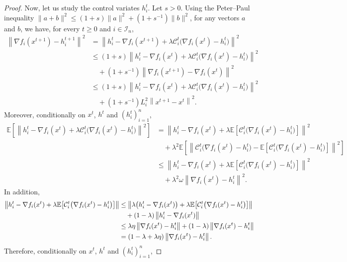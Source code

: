 \documentclass{article} %
\theoremstyle{plain}
\theoremstyle{definition}
\theoremstyle{remark}
\newcommand{\sqnorm}[1]{\left\| #1 \right\|^2}
\newcommand{\Exp}[1]{\mathbb{E}\!\left[ #1 \right]}
\begin{document}
\begin{proof}
   Now, let us study the control variates $h_i^t$. Let $s>0$. Using the Peter--Paul inequality $\|a+b\|^2 \leq (1+s) \|a\|^2 + (1+s^{-1}) \|b\|^2$, for any vectors $a$ and $b$, 
   we have, for every $t\geq 0$ and $i\in\mathcal{I}_n$,
   \begin{align*}
   \sqnorm{\nabla f_i(x^{t+1})-h_i^{t+1}}&=\sqnorm{h_i^{t}-\nabla f_i(x^{t+1}) +\lambda \mathcal{C}_i^t\big(\nabla f_i(x^t)-h_i^t\big)  }\\
   &\leq (1+s)\sqnorm{h_i^{t}-\nabla f_i(x^{t}) +\lambda \mathcal{C}_i^t\big(\nabla f_i(x^t)-h_i^t\big)  }\\ 
   &\quad+(1+s^{-1})\sqnorm{\nabla f_i(x^{t+1})-\nabla f_i(x^{t})}\\
   &\leq (1+s)\sqnorm{h_i^{t}-\nabla f_i(x^{t}) +\lambda \mathcal{C}_i^t\big(\nabla f_i(x^t)-h_i^t\big)  } \\
   &\quad+(1+s^{-1})L_i^2\sqnorm{x^{t+1}-x^{t}}.
   \end{align*}
   Moreover,  conditionally on $x^t$, $h^t$ and $(h_i^t)_{i=1}^n$, 
   \begin{align*}
   \Exp{\sqnorm{h_i^{t}-\nabla f_i(x^{t}) +\lambda \mathcal{C}_i^t\big(\nabla f_i(x^t)-h_i^t\big)  }}&=\sqnorm{h_i^{t}-\nabla f_i(x^{t}) +\lambda \Exp{\mathcal{C}_i^t\big(\nabla f_i(x^t)-h_i^t\big)} }\\
   &\quad+\lambda^2\Exp{\sqnorm{ \mathcal{C}_i^t\big(\nabla f_i(x^t)-h_i^t\big)-\Exp{ \mathcal{C}_i^t\big(\nabla f_i(x^t)-h_i^t\big) }  }}\\
   &\leq\sqnorm{h_i^{t}-\nabla f_i(x^{t}) +\lambda \Exp{\mathcal{C}_i^t\big(\nabla f_i(x^t)-h_i^t\big)} }\\
   &\quad+\lambda^2\omega \sqnorm{\nabla f_i(x^t)-h_i^t}.
   \end{align*}
   In addition,
   \begin{align*}
   \left\|h_i^{t}-\nabla f_i(x^{t}) +\lambda \Exp{\mathcal{C}_i^t\big(\nabla f_i(x^t)-h_i^t\big)}\right\|& \leq \left\|\lambda\big(h_i^{t}-\nabla f_i(x^{t})\big) +\lambda \Exp{\mathcal{C}_i^t\big(\nabla f_i(x^t)-h_i^t\big)}\right\|\notag\\
   &\quad + (1-\lambda)\left\|h_i^{t}-\nabla f_i(x^t)\right\|\\
   &\leq  \lambda\eta\left\|\nabla f_i(x^t)-h_i^{t}\right\|+ (1-\lambda)\left\|\nabla f_i(x^t)-h_i^{t}\right\|\notag\\
   &=(1-\lambda+\lambda\eta)\left\|\nabla f_i(x^t)-h_i^t\right\|.
   \end{align*}
   Therefore, conditionally on $x^t$, $h^t$ and $(h_i^t)_{i=1}^n$, 

\end{proof}
\end{document}
